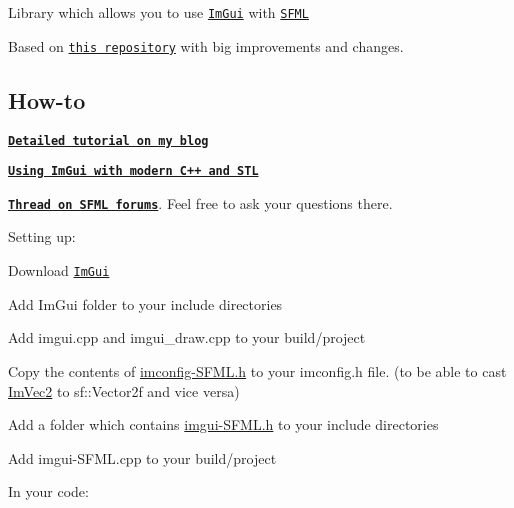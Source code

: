 Library which allows you to use \href{https://github.com/ocornut/imgui}{\tt Im\+Gui} with \href{https://github.com/SFML/SFML}{\tt S\+F\+ML}



Based on \href{https://github.com/Mischa-Alff/imgui-backends}{\tt this repository} with big improvements and changes.

\subsection*{How-\/to }


\begin{DoxyItemize}
\item \href{https://eliasdaler.github.io/using-imgui-with-sfml-pt1}{\tt {\bfseries Detailed tutorial on my blog}}
\item \href{https://eliasdaler.github.io/using-imgui-with-sfml-pt2/}{\tt {\bfseries Using Im\+Gui with modern C++ and S\+TL}}
\item \href{https://en.sfml-dev.org/forums/index.php?topic=20137.0}{\tt {\bfseries Thread on S\+F\+ML forums}}. Feel free to ask your questions there.
\end{DoxyItemize}

Setting up\+:


\begin{DoxyItemize}
\item Download \href{https://github.com/ocornut/imgui}{\tt Im\+Gui}
\item Add Im\+Gui folder to your include directories
\item Add {\ttfamily imgui.\+cpp} and {\ttfamily imgui\+\_\+draw.\+cpp} to your build/project
\item Copy the contents of {\ttfamily \hyperlink{imconfig-_s_f_m_l_8h_source}{imconfig-\/\+S\+F\+M\+L.\+h}} to your {\ttfamily imconfig.\+h} file. (to be able to cast {\ttfamily \hyperlink{struct_im_vec2}{Im\+Vec2}} to {\ttfamily sf\+::\+Vector2f} and vice versa)
\item Add a folder which contains {\ttfamily \hyperlink{imgui-_s_f_m_l_8h_source}{imgui-\/\+S\+F\+M\+L.\+h}} to your include directories
\item Add {\ttfamily imgui-\/\+S\+F\+M\+L.\+cpp} to your build/project
\end{DoxyItemize}

In your code\+:


